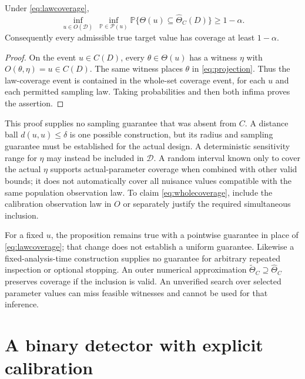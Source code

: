 \documentclass[11pt]{article}
\begin{document}
\begin{proposition}
Under \eqref{eq:lawcoverage},
\begin{equation}
 \inf_{u\in O(\mathcal D)}\ \inf_{\mathbb P\in\mathcal P(u)}
 \mathbb P\{\Theta(u)\subseteq\widehat\Theta_C(D)\}\ge 1-\alpha.
 \label{eq:wholecoverage}
\end{equation}
Consequently every admissible true target value has coverage at least $1-\alpha$.
\end{proposition}
\begin{proof}
On the event $u\in C(D)$, every $\theta\in\Theta(u)$ has a witness $\eta$ with $O(\theta,\eta)=u\in C(D)$. The same witness places $\theta$ in \eqref{eq:projection}. Thus the law-coverage event is contained in the whole-set coverage event, for each $u$ and each permitted sampling law. Taking probabilities and then both infima proves the assertion.
\end{proof}

This proof supplies no sampling guarantee that was absent from $C$. A distance ball $d(u,\widehat u)\le\delta$ is one possible construction, but its radius and sampling guarantee must be established for the actual design. A deterministic sensitivity range for $\eta$ may instead be included in $\mathcal D$. A random interval known only to cover the actual $\eta$ supports actual-parameter coverage when combined with other valid bounds; it does not automatically cover all nuisance values compatible with the same population observation law. To claim \eqref{eq:wholecoverage}, include the calibration observation law in $O$ or separately justify the required simultaneous inclusion.

For a fixed $u$, the proposition remains true with a pointwise guarantee in place of \eqref{eq:lawcoverage}; that change does not establish a uniform guarantee. Likewise a fixed-analysis-time construction supplies no guarantee for arbitrary repeated inspection or optional stopping. An outer numerical approximation $\widetilde\Theta_C\supseteq\widehat\Theta_C$ preserves coverage if the inclusion is valid. An unverified search over selected parameter values can miss feasible witnesses and cannot be used for that inference.

\section{A binary detector with explicit calibration}
\end{document}
